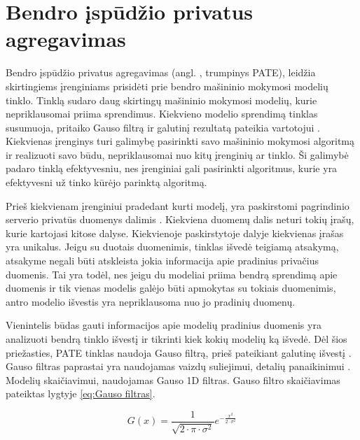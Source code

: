 \documentclass{VUMIFInfBakalaurinis}
\begin{document}
\section{Bendro įspūdžio privatus agregavimas}
\par Bendro įspūdžio privatus agregavimas (angl. , trumpinys PATE), leidžia skirtingiems įrenginiams prisidėti prie bendro mašininio mokymosi modelių tinklo. Tinklą sudaro daug skirtingų mašininio mokymosi modelių, kurie nepriklausomai priima sprendimus. Kiekvieno modelio sprendimą tinklas susumuoja, pritaiko Gauso filtrą ir galutinį rezultatą pateikia vartotojui \cite{27}. Kiekvienas įrenginys turi galimybę pasirinkti savo mašininio mokymosi algoritmą ir realizuoti savo būdu, nepriklausomai nuo kitų įrenginių ar tinklo. Ši galimybė padaro tinklą efektyvesniu, nes įrenginiai gali pasirinkti algoritmus, kurie yra efektyvesni už tinko kūrėjo parinktą algoritmą.
\par Prieš kiekvienam įrenginiui pradedant kurti modelį, yra paskirstomi pagrindinio serverio privatūs duomenys dalimis \cite{27}. Kiekviena duomenų dalis neturi tokių įrašų, kurie kartojasi kitose dalyse. Kiekvienoje paskirstytoje dalyje kiekvienas įrašas yra unikalus. Jeigu su duotais duomenimis, tinklas išvedė teigiamą atsakymą, atsakyme negali būti atskleista jokia informacija apie pradinius privačius duomenis. Tai yra todėl, nes jeigu du modeliai priima bendrą sprendimą apie duomenis ir tik vienas modelis galėjo būti apmokytas su tokiais duomenimis, antro modelio išvestis yra nepriklausoma nuo jo pradinių duomenų. 
\par Vienintelis būdas gauti informacijos apie modelių pradinius duomenis yra analizuoti bendrą tinklo išvestį ir tikrinti kiek kokių modelių ką išvedė. Dėl šios priežasties, PATE tinklas naudoja Gauso filtrą, prieš pateikiant galutinę išvestį \cite{27}. Gauso filtras paprastai yra naudojamas vaizdų suliejimui, detalių panaikinimui \cite{28}. Modelių  skaičiavimui, naudojamas Gauso 1D filtras. Gauso filtro skaičiavimas pateiktas lygtyje \eqref{eq:Gauso filtras}. 

\begin{equation}
    G(x) = \frac{1}{\sqrt{2 \cdot \pi \cdot \sigma^{2}}}e^{-\frac{x^{2}}{2 \cdot \sigma^{2}}}
    \label{eq:Gauso filtras}
\end{equation}
\end{document}
